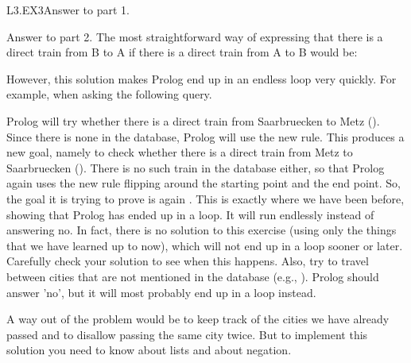 \begin{mozartANSWER}{L3.EX3}Answer to part 1. \mozartEMPTY
\begin{mozartCODEDISPLAY}\end{mozartCODEDISPLAY}
 \mozartEMPTY
 \mozartEMPTY
Answer to part 2. The most straightforward way of expressing that \mozartEMPTY
there is  a direct train from B to A if there is a direct train from A \mozartEMPTY
to B would be: \mozartEMPTY
\begin{mozartCODEDISPLAY}\end{mozartCODEDISPLAY}
 \mozartEMPTY
However, this solution makes Prolog end up in an endless loop very quickly. For \mozartEMPTY
example, when asking the following query. \mozartEMPTY
\begin{mozartCODEDISPLAY}\end{mozartCODEDISPLAY}
 \mozartEMPTY
Prolog will try whether there is a direct train from Saarbruecken to \mozartEMPTY
Metz (). Since there is none in \mozartEMPTY
the database, Prolog will use the new rule. This produces a new goal, \mozartEMPTY
namely to check whether there is a direct train from Metz to \mozartEMPTY
Saarbruecken (). There is no such \mozartEMPTY
train in the database either, so that Prolog again uses the new rule \mozartEMPTY
flipping around the starting point and the end point. So, the goal it \mozartEMPTY
is trying to prove is again \mozartEMPTY
{}. This is exactly where we have \mozartEMPTY
been before, showing that Prolog has ended up in a loop. It will run \mozartEMPTY
endlessly instead of answering no. \mozartEMPTY
In fact, there is no solution to this exercise (using only the things \mozartEMPTY
that we have learned up to now), which will not end up in a loop \mozartEMPTY
sooner or later. Carefully check your solution to see when this \mozartEMPTY
happens. Also, try to travel between cities that are not mentioned in \mozartEMPTY
the database (e.g., ). Prolog should \mozartEMPTY
answer 'no', but it will most probably end up in a loop instead.

A way out of the problem would be to keep track of the cities we have \mozartEMPTY
already passed and to disallow passing the same city twice. But to \mozartEMPTY
implement this solution you need to know about lists and about negation.\end{mozartANSWER}
